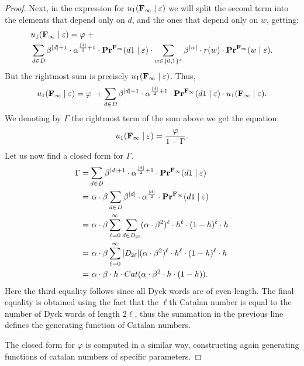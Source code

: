 \begin{proof}
Next, in the expression for $u_1({\rm {\bf F_\infty}}\mid\varepsilon)$ we will split the second term into the elements that depend only on $d$, and the ones that depend only on $w$, getting:
%
\begin{align*}
 & u_1({\rm {\bf F_\infty}}\mid\varepsilon) = \varphi \mbox{ } +\\
 & \sum_{d\in {\rm {\it D}}} \beta^{|d|+1}\cdot  \alpha^{\frac{|d|}{2}+1}\cdot \mathbf{Pr}^{{\rm {\bf F_\infty}}}(d1\mid \varepsilon) \cdot 
 \sum_{w\in \{0,1\}^*} \beta^{|w|} \cdot r(w)  \cdot \mathbf{Pr}^{{\rm {\bf F_\infty}}}(w\mid \varepsilon).
\end{align*}
%
But the rightmost sum is precisely $u_1({\rm {\bf F_\infty}}\mid\varepsilon)$. Thus, 
%
\begin{align*}
 u_1({\rm {\bf F_\infty}}\mid\varepsilon) = \varphi \mbox{ } + 
 \sum_{d\in {\rm {\it D}}} \beta^{|d|+1}\cdot  \alpha^{\frac{|d|}{2}+1}\cdot \mathbf{Pr}^{{\rm {\bf F_\infty}}}(d1\mid \varepsilon) \cdot  u_1({\rm {\bf F_\infty}}\mid\varepsilon).
\end{align*}
%
We denoting by $\Gamma$ the rightmost term of the sum above we get the equation:
$$u_1({\rm {\bf F_\infty}}\mid\varepsilon) = \frac{\varphi}{1-\Gamma}.$$
Let us now find a closed form for $\Gamma$.
%
\begin{align*}
\Gamma = & \sum_{d\in {\rm {\it D}}} \beta^{|d|+1}\cdot  \alpha^{\frac{|d|}{2}+1}\cdot \mathbf{Pr}^{{\rm {\bf F_\infty}}}(d1\mid \varepsilon)\\
 = & \mbox{ } \alpha\cdot \beta \sum_{d\in {\rm {\it D}}} \beta^{|d|}\cdot  \alpha^{\frac{|d|}{2}}\cdot \mathbf{Pr}^{{\rm {\bf F_\infty}}}(d1\mid \varepsilon) \\
  = & \mbox{ } \alpha\cdot \beta \sum_{\ell = 0}^{\infty} \sum_{d\in {\rm {\it D}}_{2\ell}} (\alpha\cdot \beta^2)^{\ell}\cdot h^{\ell}\cdot (1-h)^{\ell}\cdot h\\
   = & \mbox{ } \alpha\cdot \beta \sum_{\ell = 0}^{\infty} |{\rm {\it D}}_{2\ell}| (\alpha\cdot \beta^2)^{\ell}\cdot h^{\ell}\cdot (1-h)^{\ell}\cdot h\\
    = & \mbox{ } \alpha\cdot \beta \cdot h \cdot Cat(\alpha\cdot\beta^2 \cdot h \cdot (1-h)).\\
\end{align*}
%
Here the third equality follows since all Dyck words are of even length. The final equality is obtained using the fact that the $\ell$th Catalan number is equal to the number of Dyck words of length $2\ell$, thus the summation in the previous line defines the generating function of Catalan numbers.

The closed form for $\varphi$ is computed in a similar way, constructing again generating functions of catalan numbers of specific parameters. 
\end{proof}


